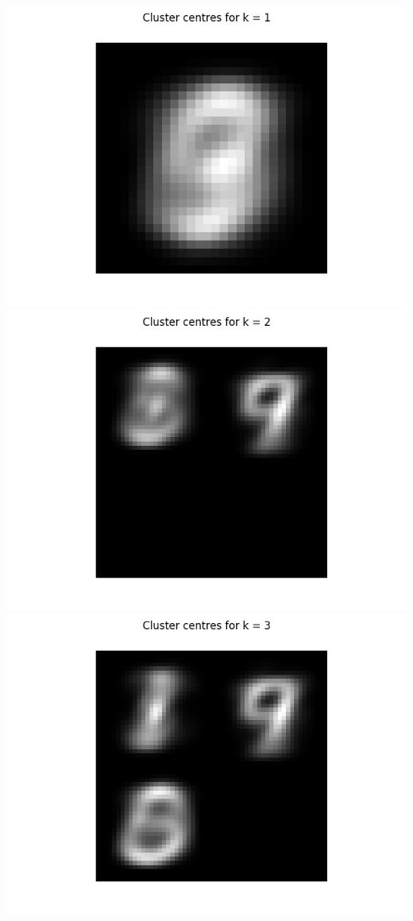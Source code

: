 \documentclass{article}
\begin{document}
\begin{center}

\includegraphics[trim=3cm 0 0 0, scale=0.4]{images/task1_6_imgs_1.png}
\includegraphics[trim=3cm 0 0 0, scale=0.4]{images/task1_6_imgs_2.png}
\includegraphics[trim=3cm 0 3cm 0, scale=0.4]{images/task1_6_imgs_3.png}

\end{center}
\end{document}
